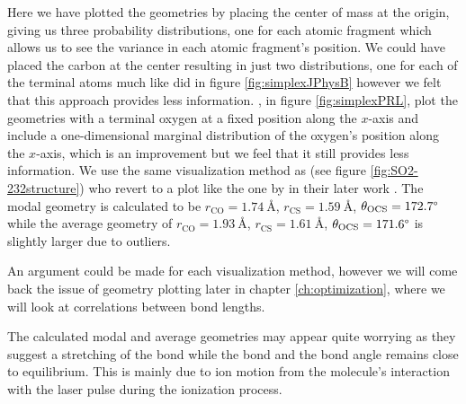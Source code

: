 Here we have plotted the geometries by placing the center of mass at the origin, giving us three probability distributions, one for each atomic fragment which allows us to see the variance in each atomic fragment's position. We could have placed the carbon at the center resulting in just two distributions, one for each of the terminal atoms much like \citet{Brichta07} did in figure \ref{fig:simplexJPhysB} however we felt that this approach provides less information. \cite{Bocharova11}, in figure \ref{fig:simplexPRL}, plot the geometries with a terminal oxygen at a fixed position along the $x$-axis and include a one-dimensional marginal distribution of the oxygen's position along the $x$-axis, which is an improvement but we feel that it still provides less information.  We use the same visualization method as \citet{Legare05structure} (see figure \ref{fig:SO2-232structure}) who revert to a plot like the one by \citet{Bocharova11} in their later work \citep{Legare05dynamics}. The modal geometry is calculated to be $r_\mathrm{CO} = \SI{1.74}{\angstrom}$, $r_\mathrm{CS} = \SI{1.59}{\angstrom}$, $ \theta_\mathrm{OCS} = 172.7\degree$ while the average geometry of $r_\mathrm{CO} = \SI{1.93}{\angstrom}$, $r_\mathrm{CS} = \SI{1.61}{\angstrom}$, $ \theta_\mathrm{OCS} = 171.6\degree$ is slightly larger due to outliers.

An argument could be made for each visualization method, however we will come back the issue of geometry plotting later in chapter \ref{ch:optimization}, where we will look at correlations between bond lengths.


The calculated modal and average geometries may appear quite worrying as they suggest a stretching of the  bond while the  bond and the bond angle remains close to equilibrium. This is mainly due to ion motion from the molecule's interaction with the laser pulse during the ionization process. %

